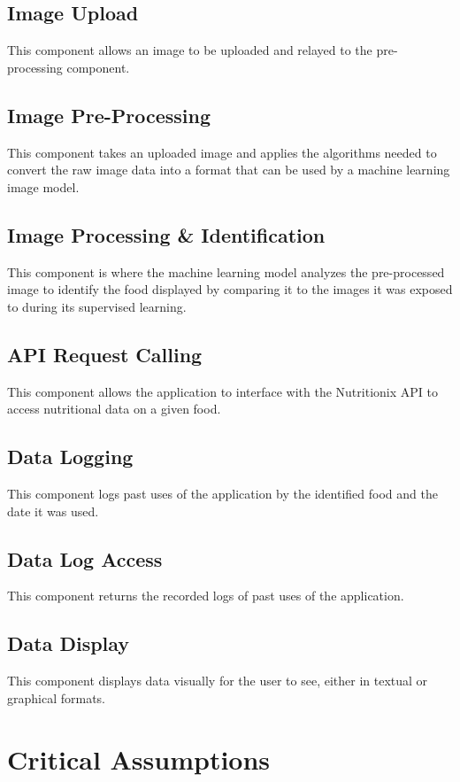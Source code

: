 \documentclass{article}
\begin{document}
\subsection{Image Upload}
This component allows an image to be uploaded and relayed to the pre-processing component.

\subsection{Image Pre-Processing}
This component takes an uploaded image and applies the algorithms needed to convert the raw image data into a format that can be used by a machine learning image model.

\subsection{Image Processing \& Identification}
This component is where the machine learning model analyzes the pre-processed image to identify the food displayed by comparing it to the images it was exposed to during its supervised learning. 

\subsection{API Request Calling}
This component allows the application to interface with the Nutritionix API to access nutritional data on a given food.  

\subsection{Data Logging}
This component logs past uses of the application by the identified food and the date it was used.   

\subsection{Data Log Access}
This component returns the recorded logs of past uses of the application.

\subsection{Data Display}
This component displays data visually for the user to see, either in textual or graphical formats.

\section{Critical Assumptions}
\end{document}
